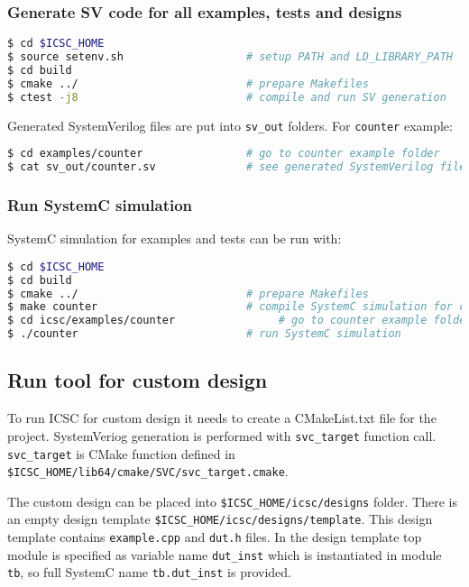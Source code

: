 \subsubsection{Generate SV code for all examples, tests and designs}
%
\begin{lstlisting}[language=bash]
$ cd $ICSC_HOME
$ source setenv.sh                   # setup PATH and LD_LIBRARY_PATH
$ cd build   
$ cmake ../                          # prepare Makefiles 
$ ctest -j8                          # compile and run SV generation
\end{lstlisting}

Generated SystemVerilog files are put into {\tt sv\_out} folders. 
For {\tt counter} example:
% 
\begin{lstlisting}[language=bash]
$ cd examples/counter                # go to counter example folder 
$ cat sv_out/counter.sv              # see generated SystemVerilog file 
\end{lstlisting}

\subsubsection{Run SystemC simulation}

SystemC simulation for examples and tests can be run with:
\begin{lstlisting}[language=bash]
$ cd $ICSC_HOME
$ cd build
$ cmake ../                          # prepare Makefiles 
$ make counter                       # compile SystemC simulation for counter example
$ cd icsc/examples/counter                # go to counter example folder
$ ./counter                          # run SystemC simulation 
\end{lstlisting}

\subsection{Run tool for custom design}

To run ICSC for custom design it needs to create a CMakeList.txt file for the project. SystemVeriog generation is performed with {\tt svc\_target} function call. {\tt svc\_target} is CMake function defined in {\tt \$ICSC\_HOME/lib64/cmake/SVC/svc\_target.cmake}. 

The custom design can be placed into {\tt \$ICSC\_HOME/icsc/designs} folder. 
There is an empty design template {\tt\$ICSC\_HOME/icsc/designs/template}. This design template contains {\tt example.cpp} and {\tt dut.h} files. 
In the design template top module is specified as  variable name {\tt dut\_inst} which is instantiated in module {\tt tb}, so full SystemC name {\tt tb.dut\_inst} is provided.

